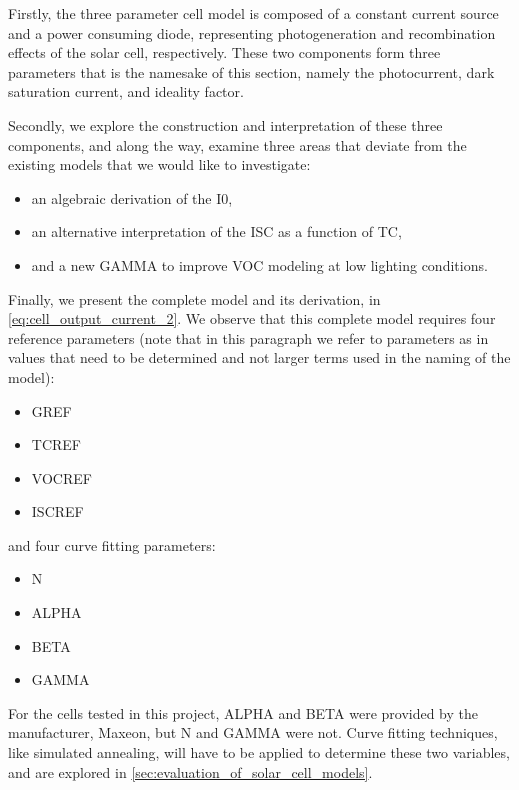 Firstly, the three parameter cell model is composed of a constant current source
and a power consuming diode, representing photogeneration and recombination
effects of the solar cell, respectively. These two components form three
parameters that is the namesake of this section, namely the photocurrent, dark
saturation current, and ideality factor.

Secondly, we explore the construction and interpretation of these three
components, and along the way, examine three areas that deviate from the
existing models that we would like to investigate:

\begin{itemize}
    \item an algebraic derivation of the \acf{I0},
    \item an alternative interpretation of the \acf{ISC} as
    a function of \acf{TC},
    \item and a new \acf{GAMMA} to improve \acf{VOC} modeling at low lighting
    conditions.
\end{itemize}

Finally, we present the complete model and its derivation, in
\autoref{eq:cell_output_current_2}. We observe that this complete model requires
four reference parameters (note that in this paragraph we refer to parameters as
in values that need to be determined and not larger terms used in the naming of
the model):

\begin{itemize}
    \item \acf{GREF}
    \item \acf{TCREF}
    \item \acf{VOCREF}
    \item \acf{ISCREF}
\end{itemize}

and four curve fitting parameters:

\begin{itemize}
    \item \acf{N}
    \item \acf{ALPHA}
    \item \acf{BETA}
    \item \acf{GAMMA}
\end{itemize}

For the cells tested in this project, \ac{ALPHA} and \ac{BETA} were provided
by the manufacturer, Maxeon, but \ac{N} and \ac{GAMMA} were not. Curve fitting
techniques, like simulated annealing, will have to be applied to determine these
two variables, and are explored in
\autoref{sec:evaluation_of_solar_cell_models}.


